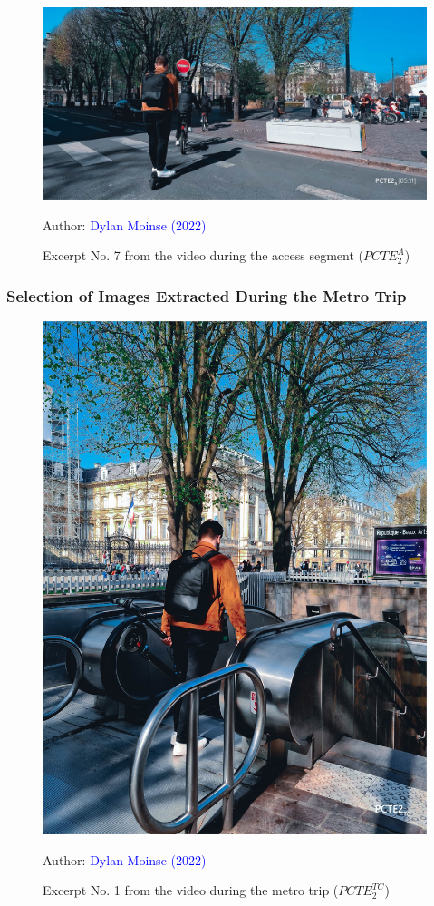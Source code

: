     \begin{figure}[h!]\vspace*{4pt}
        \caption*{Excerpt No. 7 from the video during the access segment (\(PCTE^{A}_{2}\))}
        \centerline{\includegraphics[width=0.75\columnwidth]{src/Figures/Annexes/Extrait_Video_PCTE2_Access_7.jpg}}
        \vspace{5pt}
        \begin{flushright}\scriptsize{
        Author: \textcolor{blue}{Dylan Moinse (2022)}
        }\end{flushright}
    \end{figure}

\subsubsection{Selection of Images Extracted During the Metro Trip}

    \begin{figure}[h!]\vspace*{4pt}
        \caption*{Excerpt No. 1 from the video during the metro trip (\(PCTE^{TC}_{2}\))}
        \centerline{\includegraphics[width=0.5\columnwidth]{src/Figures/Annexes/Extrait_Video_PCTE2_TC_1.jpg}}
        \vspace{5pt}
        \begin{flushright}\scriptsize{
        Author: \textcolor{blue}{Dylan Moinse (2022)}
        }\end{flushright}
    \end{figure}

